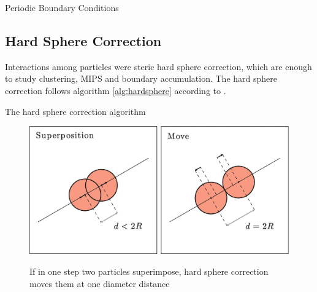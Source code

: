\documentclass[../../master_thesis_np.tex]{subfiles}
\begin{document}
	\begin{algorithm}[htp]
		\caption{Periodic Boundary Conditions} \label{alg:pbc}	
		\begin{algorithmic}[1]
			\EndIf
			\EndIf
			\EndFor
		\end{algorithmic}
	\end{algorithm}
	
	\subsection{Hard Sphere Correction}
	\label{hs}
	Interactions among particles were steric hard sphere correction, which are enough to study clustering, MIPS and boundary accumulation. The hard sphere correction follows algorithm \ref{alg:hardsphere} according to \cite{callegari_numerical_2019}.
	
	
	\begin{algorithm}[htp]
		\caption{The hard sphere correction algorithm} \label{alg:hardsphere}	
		\begin{algorithmic}[1]
			 
			
			\EndIf
			\EndFor
		\end{algorithmic}
	\end{algorithm}
	
	\begin{figure}[htp]
		\centering
		\includegraphics[width = \textwidth]{callegari_volpe_2019_hardsphere.png}
		\label{fig:hardsphere}
		\caption{If in one step two particles superimpose, hard sphere correction moves them at one diameter distance \cite{callegari_numerical_2019}}
	\end{figure}
	
\end{document}
